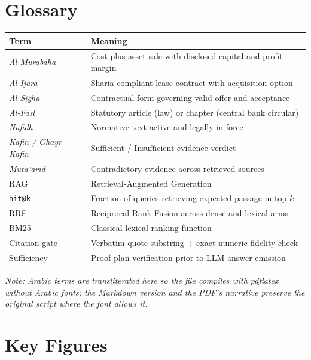 \documentclass[a4paper,12pt]{report}
\begin{document}
\chapter{Glossary}

\begin{table}[H]
\centering\small
\begin{tabular}{p{4.8cm}p{9.4cm}}
\toprule
\textbf{Term} & \textbf{Meaning} \\
\midrule
\textit{Al-Murabaha} & Cost-plus asset sale with disclosed capital and profit margin \\
\textit{Al-Ijara} & Sharia-compliant lease contract with acquisition option \\
\textit{Al-Sigha} & Contractual form governing valid offer and acceptance \\
\textit{Al-Fasl} & Statutory article (law) or chapter (central bank circular) \\
\textit{Nafidh} & Normative text active and legally in force \\
\textit{Kafin / Ghayr Kafin} & Sufficient / Insufficient evidence verdict \\
\textit{Muta`arid} & Contradictory evidence across retrieved sources \\
RAG & Retrieval-Augmented Generation \\
\texttt{hit@k} & Fraction of queries retrieving expected passage in top-$k$ \\
RRF & Reciprocal Rank Fusion across dense and lexical arms \\
BM25 & Classical lexical ranking function \\
Citation gate & Verbatim quote substring + exact numeric fidelity check \\
Sufficiency & Proof-plan verification prior to LLM answer emission \\
\bottomrule
\end{tabular}
\end{table}

\emph{Note: Arabic terms are transliterated here so the file compiles with pdflatex without Arabic fonts; the Markdown version and the PDF's narrative preserve the original script where the font allows it.}

\chapter{Key Figures}
\end{document}
